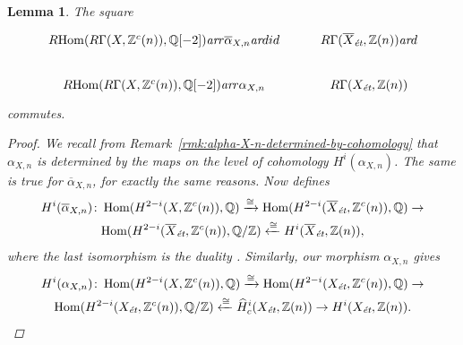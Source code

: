 \documentclass[leqno,12pt]{article}
\theoremstyle{plain}
\newtheorem{lemma}[theorem]{\indent\sc Lemma}
\theoremstyle{definition}
\DeclareMathOperator{\Hom}{Hom}
\newcommand{\QQ}{\mathbb{Q}}
\newcommand{\ZZ}{\mathbb{Z}}
\newcommand{\ar}{\text{\it ar}}
\newcommand{\et}{\text{\it \'{e}t}}
\newcommand{\RHom}{R\!\Hom}
\begin{document}
\begin{lemma}
  The square
  \[ \begin{tikzcd}
      \RHom (R\Gamma (X, \ZZ^c (n)), \QQ [-2]) \ar{r}{\overline{\alpha}_{X,n}}\ar{d}{id} & R\Gamma (\overline{X}_\et, \ZZ(n))\ar{d} \\
      \RHom (R\Gamma (X, \ZZ^c (n)), \QQ [-2]) \ar{r}{\alpha_{X,n}} & R\Gamma (X_\et, \ZZ(n))
    \end{tikzcd} \]
  commutes.

  \begin{proof}
    We recall from Remark~\ref{rmk:alpha-X-n-determined-by-cohomology} that
    $\alpha_{X,n}$ is determined by the maps on the level of cohomology
    $H^i (\alpha_{X,n})$. The same is true for $\overline{\alpha}_{X,n}$, for
    exactly the same reasons. Now \cite[Theorem~3.5]{Flach-Morin-2018} defines
    \begin{multline*}
      H^i (\overline{\alpha}_{X,n})\colon
      \Hom (H^{2-i} (X, \ZZ^c (n)), \QQ) \xrightarrow{\cong}
      \Hom (H^{2-i} (\overline{X}_\et, \ZZ^c (n)), \QQ) \to \\
      \Hom (H^{2-i} (\overline{X}_\et, \ZZ^c (n)), \QQ/\ZZ) \xleftarrow{\cong}
      H^i (\overline{X}_\et, \ZZ (n)),
    \end{multline*}
    where the last isomorphism is the duality
    \cite[Corollary~6.26]{Flach-Morin-2018}. Similarly, our morphism
    $\alpha_{X,n}$ gives
    \begin{multline*}
      H^i (\alpha_{X,n})\colon
      \Hom (H^{2-i} (X, \ZZ^c (n)), \QQ) \xrightarrow{\cong}
      \Hom (H^{2-i} (X_\et, \ZZ^c (n)), \QQ) \to \\
      \Hom (H^{2-i} (X_\et, \ZZ^c (n)), \QQ/\ZZ) \xleftarrow{\cong}
      \widehat{H}^i_c (X_\et, \ZZ (n)) \to
      H^i (X_\et, \ZZ (n)).
    \end{multline*}


\end{proof}
\end{lemma}
\end{document}
